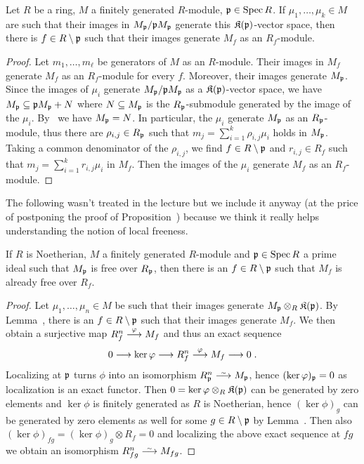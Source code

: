 \documentclass[a4paper,parskip=half,numbers=enddot, DIV=12, headheight=30pt]{scrreprt}
\begin{document}
\begin{lem}
    Let $R$ be a ring, $M$ a finitely generated $R$-module, $\mathfrak{p}\in \operatorname{Spec} R$. If $\mu_1,\ldots,\mu_k\in M$ are such that their images in $M_{\mathfrak{p}}/\mathfrak{p} M_{\mathfrak{p}}$ generate this $\mathfrak{K}(\mathfrak{p})$-vector space, then there is $f\in R\setminus \mathfrak{p}$ such that their images generate $M_f$ as an $R_f$-module.
\end{lem}
\begin{proof}
    Let $m_1,\ldots, m_\ell$ be generators of $M$ as an $R$-module. Their images in $M_f$ generate $M_f$ as an $R_f$-module for every $f$. Moreover, their images generate $M_{\mathfrak{p}}$. Since the images of $\mu_i$ generate $M_{\mathfrak{p}}/\mathfrak{p} M_{\mathfrak{p}}$ as a $\mathfrak{K}(\mathfrak{p})$-vector space, we have $M_{\mathfrak{p}} \subseteq \mathfrak{p} M_{\mathfrak{p}} +N$ where $N\subseteq M_{\mathfrak{p}}$ is the $R_{\mathfrak{p}}$-submodule generated by the image of the $\mu_i$. By \NAK\ we have $M_{\mathfrak{p}}=N$. In particular, the $\mu_i$ generate $M_{\mathfrak{p}}$ as an $R_{\mathfrak{p}}$-module, thus there are $\rho_{i,j}\in R_{\mathfrak{p}}$ such that $m_j = \sum_{i=1}^k \rho_{i,j} \mu_i$ holds in $M_{\mathfrak{p}}$. Taking a common denominator of the $\rho_{i,j}$, we find $f\in R\setminus \mathfrak{p}$ and $r_{i,j}\in R_f$ such that $m_j = \sum_{i=1}^k r_{i,j}\mu_i$ in $M_f$. Then the images of the $\mu_i$ generate $M_f$ as an $R_f$-module.
\end{proof}
The following wasn't treated in the lecture but we include it anyway (at the price of postponing the proof of Proposition~) because we think it really helps understanding the notion of local freeness.
\begin{cor}
	If $R$ is Noetherian, $M$ a finitely generated $R$-module and $\mathfrak{p}\in\operatorname{Spec} R$ a prime ideal such that $M_{\mathfrak{p}}$ is free over $R_{\mathfrak{p}}$, then there is an $f\in R\setminus \mathfrak{p}$ such that $M_f$ is already free over $R_f$.
\end{cor}
\begin{proof}
	Let $\mu_1,\ldots,\mu_n\in M$ be such that their images generate $M_{\mathfrak{p}}\otimes_R\mathfrak{K}(\mathfrak{p})$. By Lemma~, there is an $f\in R\setminus \mathfrak{p}$ such that their images generate $M_f$. We then obtain a surjective map $R_f^n\morphism[\phi]M_f$ and thus an exact sequence
	\begin{align*}
		0\morphism\ker\phi\morphism R_f^n\morphism[\phi]M_f\morphism 0\;.
	\end{align*}
	Localizing at $\mathfrak{p}$ turns $\phi$ into an isomorphism $R_\pp^n\isomorphism M_\pp$, hence $(\ker\varphi)_{\mathfrak{p}}=0$ as localization is an exact functor. Then $0=\ker\varphi\otimes_R\mathfrak{K}(\mathfrak{p})$ can be generated by zero elements and $\ker\phi$ is finitely generated as $R$ is Noetherian, hence $(\ker\phi)_g$ can be generated by zero elements as well for some $g\in R\setminus \mathfrak{p}$ by Lemma~. Then also $(\ker\phi)_{fg}=(\ker\phi)_g\otimes R_f=0$ and localizing the above exact sequence at $fg$ we obtain an isomorphism $R_{fg}^n\isomorphism M_{fg}$.
\end{proof}
\end{document}
